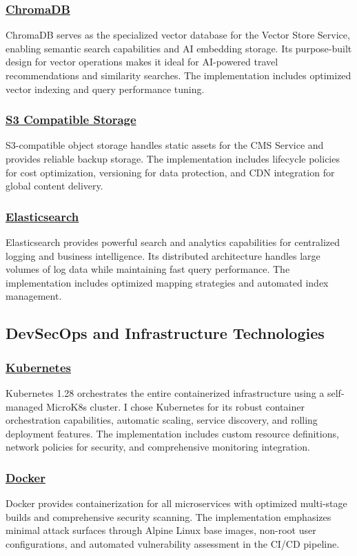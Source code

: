 \subsubsection*{\underline{ChromaDB}}
ChromaDB serves as the specialized vector database for the Vector Store Service, enabling semantic search capabilities and AI embedding storage. Its purpose-built design for vector operations makes it ideal for AI-powered travel recommendations and similarity searches. The implementation includes optimized vector indexing and query performance tuning.

\subsubsection*{\underline{S3 Compatible Storage}}
S3-compatible object storage handles static assets for the CMS Service and provides reliable backup storage. The implementation includes lifecycle policies for cost optimization, versioning for data protection, and CDN integration for global content delivery.

\subsubsection*{\underline{Elasticsearch}}
Elasticsearch provides powerful search and analytics capabilities for centralized logging and business intelligence. Its distributed architecture handles large volumes of log data while maintaining fast query performance. The implementation includes optimized mapping strategies and automated index management.

\subsection{DevSecOps and Infrastructure Technologies}

\subsubsection*{\underline{Kubernetes}}
Kubernetes 1.28 orchestrates the entire containerized infrastructure using a self-managed MicroK8s cluster. I chose Kubernetes for its robust container orchestration capabilities, automatic scaling, service discovery, and rolling deployment features. The implementation includes custom resource definitions, network policies for security, and comprehensive monitoring integration.

\subsubsection*{\underline{Docker}}
Docker provides containerization for all microservices with optimized multi-stage builds and comprehensive security scanning. The implementation emphasizes minimal attack surfaces through Alpine Linux base images, non-root user configurations, and automated vulnerability assessment in the CI/CD pipeline.

